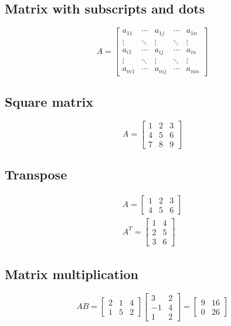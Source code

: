 \documentclass[a4paper, 12pt]{article}
\begin{document}
\subsection{Matrix with subscripts and dots}

\[
A = \begin{bmatrix} a_{11} & \cdots & a_{1j} & \cdots & a_{1n} \\ \vdots & \ddots & \vdots & \ddots & \vdots \\ a_{i1} & \cdots & a_{ij} & \cdots & a_{in} \\ \vdots & \ddots & \vdots & \ddots & \vdots \\ a_{m1} & \cdots & a_{mj} & \cdots & a_{mn} \end{bmatrix}
\]

\subsection{Square matrix}

\[
A = \begin{bmatrix} 1 & 2 & 3 \\ 4 & 5 & 6 \\ 7 & 8 & 9 \end{bmatrix}
\]

\subsection{Transpose}

\begin{gather}
A = \begin{bmatrix} 1 & 2 & 3 \\ 4 & 5 & 6 \end{bmatrix} \\
A^T = \begin{bmatrix} 1 & 4 \\ 2 & 5 \\ 3 & 6 \end{bmatrix}
\end{gather}

\subsection{Matrix multiplication}

\[
AB = \begin{bmatrix} 2 & 1 & 4 \\ 1 & 5 & 2 \end{bmatrix} \begin{bmatrix} 3 & 2 \\ -1 & 4 \\ 1 & 2 \end{bmatrix} = \begin{bmatrix} 9 & 16 \\ 0 & 26 \end{bmatrix}
\]
\end{document}
